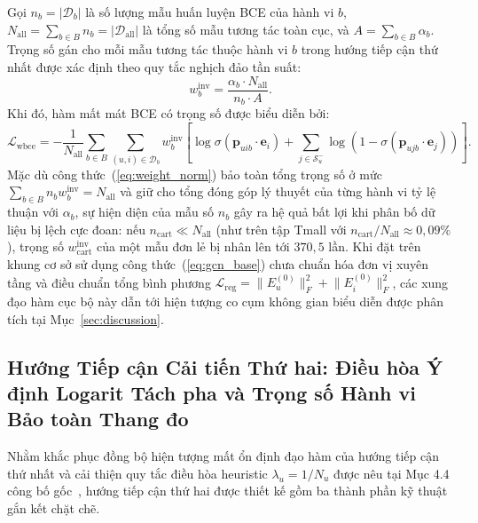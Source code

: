 \documentclass{llncs}
\begin{document}
Gọi $n_b = |\mathcal{D}_b|$ là số lượng mẫu huấn luyện BCE của hành vi $b$, $N_{\mathrm{all}} = \sum_{b \in B} n_b = |\mathcal{D}_{\mathrm{all}}|$ là tổng số mẫu tương tác toàn cục, và $A = \sum_{b \in B} \alpha_b$. Trọng số gán cho mỗi mẫu tương tác thuộc hành vi $b$ trong hướng tiếp cận thứ nhất được xác định theo quy tắc nghịch đảo tần suất:
\begin{equation}
w_b^{\mathrm{inv}} = \frac{\alpha_b \cdot N_{\mathrm{all}}}{n_b \cdot A}.
\label{eq:weight_norm}
\end{equation}
Khi đó, hàm mất mát BCE có trọng số được biểu diễn bởi:
\begin{equation}
\mathcal{L}_{\mathrm{wbce}} = -\frac{1}{N_{\mathrm{all}}} \sum_{b \in B} \sum_{(u, i) \in \mathcal{D}_b} w_b^{\mathrm{inv}} \left[\log \sigma(\mathbf{p}_{uib} \cdot \mathbf{e}_i) + \sum_{j \in \mathcal{S}_u^-} \log(1 - \sigma(\mathbf{p}_{ujb} \cdot \mathbf{e}_j))\right].
\end{equation}
Mặc dù công thức~(\ref{eq:weight_norm}) bảo toàn tổng trọng số ở mức $\sum_{b \in B} n_b w_b^{\mathrm{inv}} = N_{\mathrm{all}}$ và giữ cho tổng đóng góp lý thuyết của từng hành vi tỷ lệ thuận với $\alpha_b$, sự hiện diện của mẫu số $n_b$ gây ra hệ quả bất lợi khi phân bố dữ liệu bị lệch cực đoan: nếu $n_{\mathrm{cart}} \ll N_{\mathrm{all}}$ (như trên tập Tmall với $n_{\mathrm{cart}} / N_{\mathrm{all}} \approx 0{,}09\%$), trọng số $w_{\mathrm{cart}}^{\mathrm{inv}}$ của một mẫu đơn lẻ bị nhân lên tới $370{,}5$ lần. Khi đặt trên khung cơ sở sử dụng công thức~(\ref{eq:gcn_base}) chưa chuẩn hóa đơn vị xuyên tầng và điều chuẩn tổng bình phương $\mathcal{L}_{\mathrm{reg}} = \lVert E_u^{(0)} \rVert_F^2 + \lVert E_i^{(0)} \rVert_F^2$, các xung đạo hàm cục bộ này dẫn tới hiện tượng co cụm không gian biểu diễn được phân tích tại Mục~\ref{sec:discussion}.

\subsection{Hướng Tiếp cận Cải tiến Thứ hai: Điều hòa Ý định Logarit Tách pha và Trọng số Hành vi Bảo toàn Thang đo}
\label{sec:second_approach}

Nhằm khắc phục đồng bộ hiện tượng mất ổn định đạo hàm của hướng tiếp cận thứ nhất và cải thiện quy tắc điều hòa heuristic $\lambda_u = 1/N_u$ được nêu tại Mục 4.4 công bố gốc~\cite{yan2024bipn}, hướng tiếp cận thứ hai được thiết kế gồm ba thành phần kỹ thuật gắn kết chặt chẽ.
\end{document}
